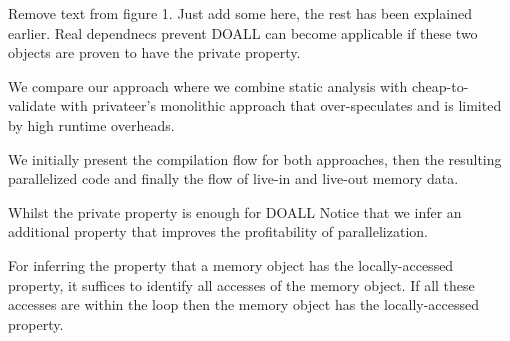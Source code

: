 Remove text from figure 1. Just add some here, the rest has been explained
earlier.
Real dependnecs prevent
DOALL can become applicable if these two objects are proven to have the
private property.

We compare our approach where we combine static analysis with cheap-to-validate
with privateer's monolithic approach that over-speculates and is limited by high
runtime overheads.

We initially present the compilation flow for both approaches, then the
resulting parallelized code and finally the flow of live-in and live-out memory
data.

Whilst the private property is enough for DOALL
Notice that we infer an additional property that improves the profitability
of parallelization.


For inferring the property that a memory object has the locally-accessed
property, it suffices to identify all accesses of the memory object. If all
these accesses are within the loop then the memory object has the
locally-accessed property.



